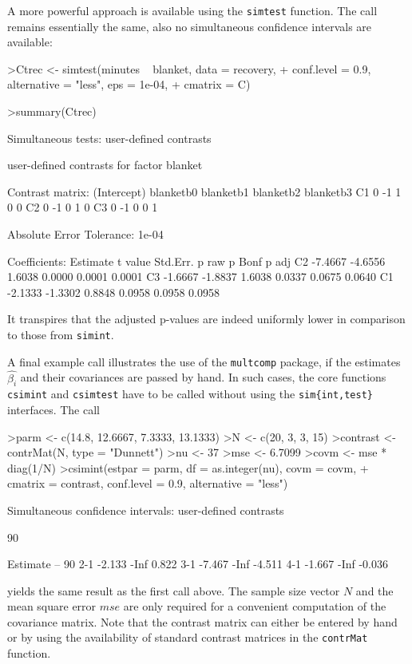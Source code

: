 \documentclass{article}
\begin{document}
A more powerful approach is available using the \texttt{simtest}
function. The call remains essentially the same, also no simultaneous confidence intervals are available:
\small
\begin{Schunk}
\begin{Sinput}
>Ctrec <- simtest(minutes ~ blanket, data = recovery, 
+     conf.level = 0.9, alternative = "less", eps = 1e-04, 
+     cmatrix = C)
\end{Sinput}
\end{Schunk}
\begin{Schunk}
\begin{Sinput}
>summary(Ctrec)
\end{Sinput}
\begin{Soutput}
	 Simultaneous tests: user-defined contrasts 

	 user-defined contrasts for factor blanket

Contrast matrix:
   (Intercept) blanketb0 blanketb1 blanketb2 blanketb3
C1           0        -1         1         0         0
C2           0        -1         0         1         0
C3           0        -1         0         0         1


Absolute Error Tolerance:  1e-04 

Coefficients:
   Estimate t value Std.Err.  p raw p Bonf  p adj
C2  -7.4667 -4.6556   1.6038 0.0000 0.0001 0.0001
C3  -1.6667 -1.8837   1.6038 0.0337 0.0675 0.0640
C1  -2.1333 -1.3302   0.8848 0.0958 0.0958 0.0958
\end{Soutput}
\end{Schunk}
\normalsize
It transpires that the adjusted p-values are indeed
uniformly lower in comparison to those from \texttt{simint}.

A final example call illustrates the use of the \texttt{multcomp} package, if the
estimates $\hat{\beta_i}$ and their covariances are passed by
hand. In such cases, the core functions \texttt{csimint} and
\texttt{csimtest} have to be called without using the
\texttt{sim\{int,test\}} interfaces. The call 
\small
\begin{Schunk}
\begin{Sinput}
>parm <- c(14.8, 12.6667, 7.3333, 13.1333)
>N <- c(20, 3, 3, 15)
>contrast <- contrMat(N, type = "Dunnett")
>nu <- 37
>mse <- 6.7099
>covm <- mse * diag(1/N)
>csimint(estpar = parm, df = as.integer(nu), covm = covm, 
+     cmatrix = contrast, conf.level = 0.9, alternative = "less")
\end{Sinput}
\begin{Soutput}
	Simultaneous confidence intervals: user-defined
	contrasts

	90 % confidence intervals

    Estimate   --   90 %
2-1   -2.133 -Inf  0.822
3-1   -7.467 -Inf -4.511
4-1   -1.667 -Inf -0.036
\end{Soutput}
\end{Schunk}
\normalsize 
yields the same result as the first call above. The
sample size vector $N$ and the mean square error $mse$ are only
required for a convenient computation of the covariance matrix.
Note that the contrast matrix can either be entered by hand or by
using the availability of standard contrast matrices in the
\texttt{contrMat} function.
\end{document}

